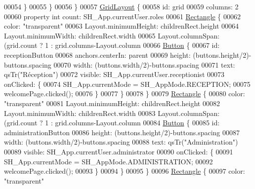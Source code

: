 \begin{DoxyCode}
00054                 \}
00055             \}
00056         \}
00057         \hyperlink{classGridLayout}{GridLayout} \{
00058             \textcolor{keywordtype}{id}: grid
00059             columns: 2
00060             \textcolor{keyword}{property} \textcolor{keywordtype}{int} count: SH\_App.currentUser.roles
00061             \hyperlink{classRectangle}{Rectangle} \{
00062                 color: \textcolor{stringliteral}{"transparent"}
00063                 Layout.minimumHeight: childrenRect.height
00064                 Layout.minimumWidth: childrenRect.width
00065                 Layout.columnSpan: (grid.count%
      ? 1 : grid.columns-Layout.column
00066                 \hyperlink{classButton}{Button} \{
00067                     \textcolor{keywordtype}{id}: receptionButton
00068                     anchors.centerIn: parent
00069                     height: (buttons.height/2)-buttons.spacing
00070                     width: (buttons.width/2)-buttons.spacing
00071                     text: qsTr(\textcolor{stringliteral}{"Réception"})
00072                     visible: SH\_App.currentUser.receptionist
00073                     onClicked: \{
00074                         SH\_App.currentMode = SH\_AppMode.RECEPTION;
00075                         welcomePage.clicked();
00076                     \}
00077                 \}
00078             \}
00079             \hyperlink{classRectangle}{Rectangle} \{
00080                 color: \textcolor{stringliteral}{"transparent"}
00081                 Layout.minimumHeight: childrenRect.height
00082                 Layout.minimumWidth: childrenRect.width
00083                 Layout.columnSpan: (grid.count%
      ? 1 : grid.columns-Layout.column
00084                 \hyperlink{classButton}{Button} \{
00085                     \textcolor{keywordtype}{id}: administrationButton
00086                     height: (buttons.height/2)-buttons.spacing
00087                     width: (buttons.width/2)-buttons.spacing
00088                     text: qsTr(\textcolor{stringliteral}{"Administration"})
00089                     visible: SH\_App.currentUser.administrator
00090                     onClicked: \{
00091                         SH\_App.currentMode = SH\_AppMode.ADMINISTRATION;
00092                         welcomePage.clicked();
00093                     \}
00094                 \}
00095             \}
00096             \hyperlink{classRectangle}{Rectangle} \{
00097                 color: \textcolor{stringliteral}{"transparent"}

\end{DoxyCode}

